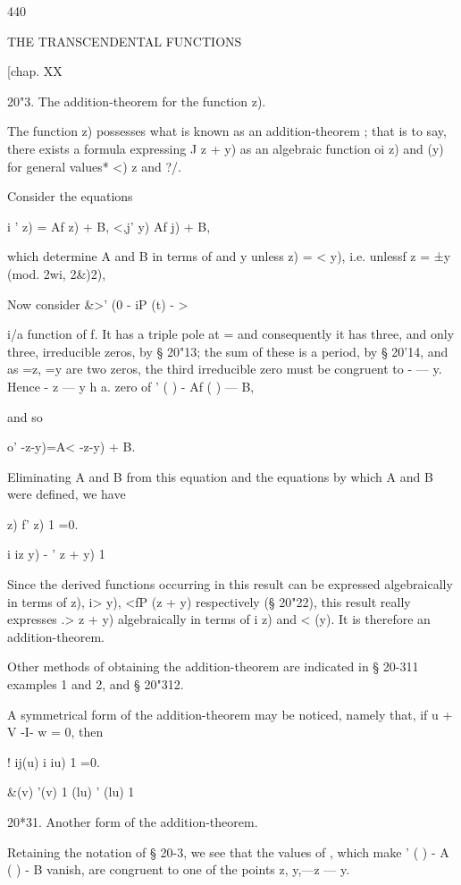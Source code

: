 {440



THE TRANSCENDENTAL FUNCTIONS



[chap. XX



20"3. The addition-theorem for the function z).

The function z) possesses what is known as an addition-theorem ; that
is to say, there exists a formula expressing J z + y) as an algebraic
function oi z) and (y) for general values* <) z and ?/.

Consider the equations

i ' z) = Af z) + B, <,j' y) Af j) + B,

which determine A and B in terms of and y unless z) = < y), i.e.
unlessf z = ±y (mod. 2wi, 2\&)2),

Now consider \&>' (0 - iP (t) - >

 i/a function of f. It has a triple pole at = and consequently it has
three, and only three, irreducible zeros, by § 20"13; the sum of these
is a period, by § 20'14, and as =z, =y are two zeros, the third
irreducible zero must be congruent to - — y. Hence - z — y h a. zero
of ' ( ) - Af ( ) — B,

and so

 o' -z-y)=A< -z-y) + B.

Eliminating A and B from this equation and the equations by which A
and B were defined, we have

  z) f' z) 1 =0.

i iz y) - ' z + y) 1

Since the derived functions occurring in this result can be expressed
algebraically in terms of z), i> y), <fP (z + y) respectively (§
20"22), this result really expresses .> z + y) algebraically in terms
of i z) and < (y). It is therefore an addition-theorem.

Other methods of obtaining the addition-theorem are indicated in §
20-311 examples 1 and 2, and § 20"312.

A symmetrical form of the addition-theorem may be noticed, namely
that, if u + V -I- w = 0, then

! ij(u) i iu) 1 =0.

\&(v) '(v) 1 (lu) ' (lu) 1

20*31. Another form of the addition-theorem.

Retaining the notation of § 20-3, we see that the values of , which
make ' ( ) - A ( ) - B vanish, are congruent to one of the points z,
y,—z — y.

}
